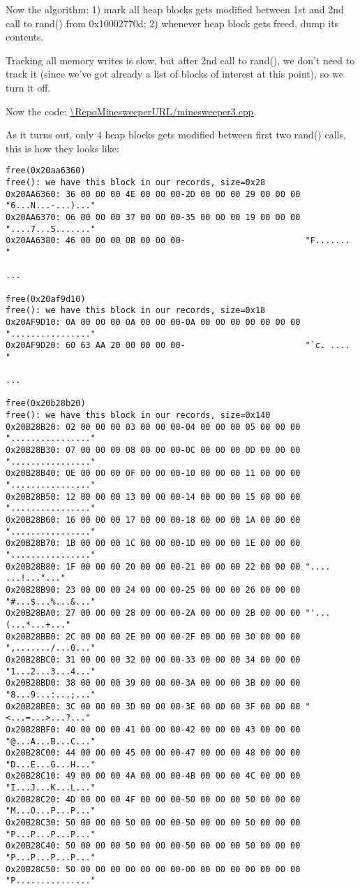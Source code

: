 Now the algorithm:
1) mark all heap blocks gets modified between 1st and 2nd call to rand() from 0x10002770d;
2) whenever heap block gets freed, dump its contents.

Tracking all memory writes is slow, but after 2nd call to rand(), we don't need to track it (since we've got already a list of blocks of interest at this point), so we turn it off.

Now the code: \url{\RepoMinesweeperURL/minesweeper3.cpp}.

As it turns out, only 4 heap blocks gets modified between first two rand() calls, this is how they looks like:

\begin{lstlisting}
free(0x20aa6360)
free(): we have this block in our records, size=0x28
0x20AA6360: 36 00 00 00 4E 00 00 00-2D 00 00 00 29 00 00 00 "6...N...-...)..."
0x20AA6370: 06 00 00 00 37 00 00 00-35 00 00 00 19 00 00 00 "....7...5......."
0x20AA6380: 46 00 00 00 0B 00 00 00-                        "F.......        "

...

free(0x20af9d10)
free(): we have this block in our records, size=0x18
0x20AF9D10: 0A 00 00 00 0A 00 00 00-0A 00 00 00 00 00 00 00 "................"
0x20AF9D20: 60 63 AA 20 00 00 00 00-                        "`c. ....        "

...

free(0x20b28b20)
free(): we have this block in our records, size=0x140
0x20B28B20: 02 00 00 00 03 00 00 00-04 00 00 00 05 00 00 00 "................"
0x20B28B30: 07 00 00 00 08 00 00 00-0C 00 00 00 0D 00 00 00 "................"
0x20B28B40: 0E 00 00 00 0F 00 00 00-10 00 00 00 11 00 00 00 "................"
0x20B28B50: 12 00 00 00 13 00 00 00-14 00 00 00 15 00 00 00 "................"
0x20B28B60: 16 00 00 00 17 00 00 00-18 00 00 00 1A 00 00 00 "................"
0x20B28B70: 1B 00 00 00 1C 00 00 00-1D 00 00 00 1E 00 00 00 "................"
0x20B28B80: 1F 00 00 00 20 00 00 00-21 00 00 00 22 00 00 00 ".... ...!..."..."
0x20B28B90: 23 00 00 00 24 00 00 00-25 00 00 00 26 00 00 00 "#...$...%...&..."
0x20B28BA0: 27 00 00 00 28 00 00 00-2A 00 00 00 2B 00 00 00 "'...(...*...+..."
0x20B28BB0: 2C 00 00 00 2E 00 00 00-2F 00 00 00 30 00 00 00 ",......./...0..."
0x20B28BC0: 31 00 00 00 32 00 00 00-33 00 00 00 34 00 00 00 "1...2...3...4..."
0x20B28BD0: 38 00 00 00 39 00 00 00-3A 00 00 00 3B 00 00 00 "8...9...:...;..."
0x20B28BE0: 3C 00 00 00 3D 00 00 00-3E 00 00 00 3F 00 00 00 "<...=...>...?..."
0x20B28BF0: 40 00 00 00 41 00 00 00-42 00 00 00 43 00 00 00 "@...A...B...C..."
0x20B28C00: 44 00 00 00 45 00 00 00-47 00 00 00 48 00 00 00 "D...E...G...H..."
0x20B28C10: 49 00 00 00 4A 00 00 00-4B 00 00 00 4C 00 00 00 "I...J...K...L..."
0x20B28C20: 4D 00 00 00 4F 00 00 00-50 00 00 00 50 00 00 00 "M...O...P...P..."
0x20B28C30: 50 00 00 00 50 00 00 00-50 00 00 00 50 00 00 00 "P...P...P...P..."
0x20B28C40: 50 00 00 00 50 00 00 00-50 00 00 00 50 00 00 00 "P...P...P...P..."
0x20B28C50: 50 00 00 00 00 00 00 00-00 00 00 00 00 00 00 00 "P..............."


\end{lstlisting}
